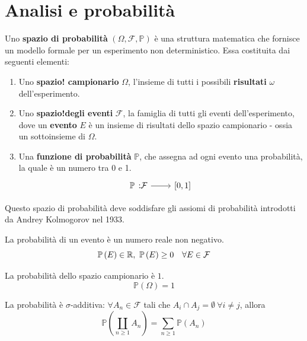 \section{Analisi e probabilità}
\begin{define}
Uno \textbf{spazio di probabilità} $\left(\Omega,\mathcal{F},\mathbb{P}\right)$ è una struttura matematica che fornisce un modello formale per un esperimento non deterministico. Essa costituita dai seguenti elementi:
\begin{enumerate}
	\item Uno \textbf{spazio! campionario} $\Omega$, l'insieme di tutti i possibili \textbf{risultati} $\omega$ dell'esperimento.
	\item Uno \textbf{spazio!degli eventi} $\mathcal{F}$, la famiglia di tutti gli eventi dell'esperimento, dove un \textbf{evento} $E$ è un insieme di risultati dello spazio campionario - ossia un sottoinsieme di $\Omega$.
	\item Una \textbf{funzione di probabilità} $\mathbb{P}$, che assegna ad ogni evento una probabilità, la quale è un numero tra 0 e 1.
	\begin{equation}
		\funz{\mathbb{P}}{\mathcal{F}}{\left[0,1\right]}
	\end{equation}
\end{enumerate}
\end{define}
Questo spazio di probabilità deve soddisfare gli assiomi di probabilità introdotti da Andrey Kolmogorov nel 1933.
\begin{axiom}
	La probabilità di un evento è un numero reale non negativo.
	\begin{equation}
		\mathbb{P}\left(E\right)\in\realset,\ \mathbb{P}\left(E\right)\geq 0\quad \forall E\in\mathcal{F} 
	\end{equation}
\end{axiom}
\begin{axiom}
	La probabilità dello spazio campionario è $1$.
	\begin{equation}
		\mathbb{P}\left(\Omega\right)=1
	\end{equation}
\end{axiom}
\begin{axiom}
	La probabilità è $\sigma$-additiva:	$\forall A_n\in\mathcal{F}$ tali che $A_i\cap A_j=\emptyset\ \forall i\neq j$, allora
	\begin{equation}
		\mathbb{P}\left(\coprod_{n\geq 1}A_n\right)=\sum_{n\geq 1}\mathbb{P}\left(A_n\right)
	\end{equation}
\end{axiom}
